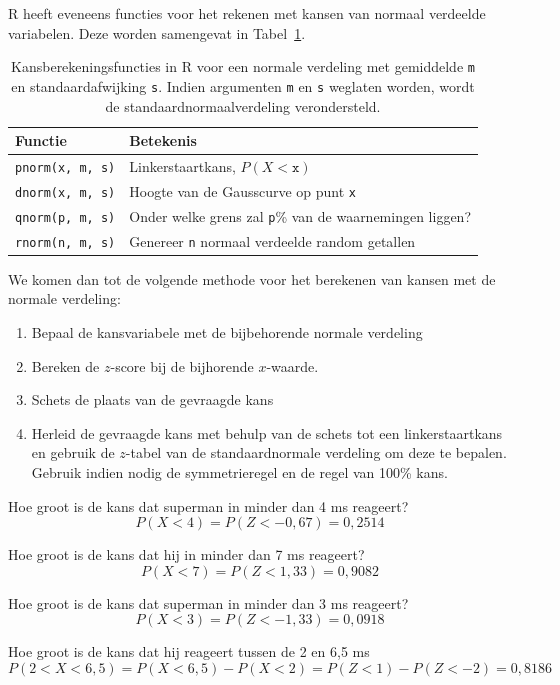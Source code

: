 {R heeft eveneens functies voor het rekenen met kansen van normaal verdeelde variabelen. Deze worden samengevat in Tabel~\ref{rab:norm-prob-r}.

\begin{table}
  \centering
  \begin{tabular}{ll}
  	\textbf{Functie}      & \textbf{Betekenis}                                             \\ \hline
  	\verb|pnorm(x, m, s)| & Linkerstaartkans, $P(X<\mathtt{x})$                            \\
  	\verb|dnorm(x, m, s)| & Hoogte van de Gausscurve op punt \texttt{x}                    \\
  	\verb|qnorm(p, m, s)| & Onder welke grens zal \texttt{p}\% van de waarnemingen liggen? \\
  	\verb|rnorm(n, m, s)| & Genereer \texttt{n} normaal verdeelde random getallen
  \end{tabular}
  
  \caption{Kansberekeningsfuncties in R voor een normale verdeling met gemiddelde \texttt{m} en standaardafwijking \texttt{s}. Indien argumenten \texttt{m} en \texttt{s} weglaten worden, wordt de standaardnormaalverdeling verondersteld.}
  \label{rab:norm-prob-r}
\end{table}

We komen dan tot de volgende methode voor het berekenen van kansen met de normale verdeling:
\begin{enumerate}
  \item Bepaal de kansvariabele met de bijbehorende normale verdeling
  \item Bereken de $z$-score bij de bijhorende $x$-waarde.
  \item Schets de plaats van de gevraagde kans
  \item Herleid de gevraagde kans met behulp van de schets tot een linkerstaartkans en gebruik de $z$-tabel van de standaardnormale verdeling om deze te bepalen. Gebruik indien nodig de symmetrieregel en de regel van 100\% kans.
\end{enumerate}

\begin{example}
Hoe groot is de kans dat superman in minder dan 4 ms reageert?
\[ P(X < 4) = P(Z < -0,67) = 0,2514 \]
\end{example}
\begin{example}
Hoe groot is de kans dat hij in minder dan 7 ms reageert?
\[ P(X < 7) = P(Z < 1,33) = 0,9082 \]
\end{example}
\begin{example}
Hoe groot is de kans dat superman in minder dan 3 ms reageert?
\[ P(X<3) = P(Z < -1,33) = 0,0918 \]
\end{example}
\begin{example}
Hoe groot is de kans dat hij reageert tussen de 2 en 6,5 ms
\[ P( 2 < X < 6,5) = P(X<6,5) - P(X<2) = P(Z<1) - P(Z<-2) = 0,8186 \]
\end{example}

}
